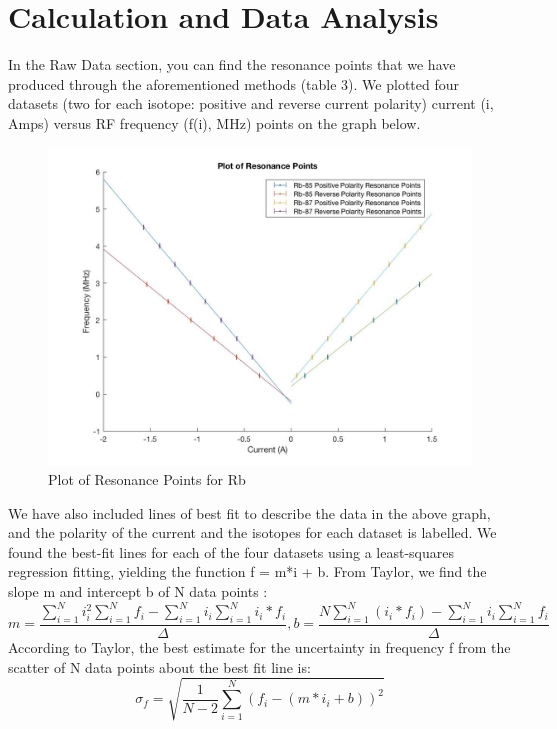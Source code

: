 \documentclass{article}
\begin{document}
\section{Calculation and Data Analysis}
    \indent In the Raw Data section, you can find the resonance points that we have produced through the aforementioned methods (table 3). We plotted four datasets (two for each isotope: positive and reverse current polarity) current (i, Amps) versus RF frequency (f(i), MHz) points on the graph below.
    \begin{figure}[H] %
        \centering
        \includegraphics[scale = 0.25]{1.jpg}
        \caption{Plot of Resonance Points for Rb}
        \label{fig:my_label}
    \end{figure}
    \indent We have also included lines of best fit to describe the data in the above graph, and the polarity of the current and the isotopes for each dataset is labelled. We found the best-fit lines for each of the four datasets using a least-squares regression fitting, yielding the function f = m*i + b. From Taylor, we find the slope m and intercept b of N data points \cite{err}:
    \begin{equation}
        m = \frac{\sum_{i=1}^N i_i^2 \sum_{i=1}^N f_i - \sum_{i=1}^N i_i \sum_{i=1}^N i_i*f_i}{\Delta},
        b = \frac{N\sum_{i=1}^N(i_i*f_i) - \sum_{i=1}^N i_i \sum_{i=1}^N f_i}{\Delta}
    \end{equation}
     According to Taylor, the best estimate for the uncertainty in frequency f from the scatter of N data points about the best fit line is:
    \begin{equation}
        \sigma_f = \sqrt{\frac{1}{N-2}\sum_{i=1}^N(f_i-(m*i_i + b))^2}
    \end{equation}
\end{document}
